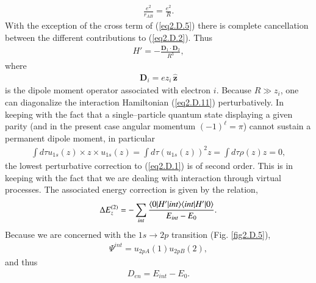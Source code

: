 \begin{subappendices}
\begin{align}
\frac{e^2}{r_{AB}}=\frac{e^2}{R}.
\end{align}
With the exception of the cross term of (\ref{eq2.D.5}) there is complete cancellation between the different contributions to (\ref{eq2.D.2}). Thus
\begin{align}\label{eq2.D.11}
H'=-\frac{\mathbf D_1\cdot\mathbf D_2}{R^3},
\end{align} 
where
\begin{align}\label{eq2.D.12}
\mathbf D_i=ez_i\,\hat {\mathbf{z}}
\end{align} 
is the dipole moment operator associated with electron $i$. Because $R\gg z_i$, one can diagonalize the interaction Hamiltonian (\ref{eq2.D.11}) perturbatively. In keeping with the fact that   a single--particle quantum state displaying a given parity (and in the present case angular momentum $(-1)^\ell=\pi$) cannot sustain a permanent dipole moment, in particular
\begin{align}\label{eq2.D.13}
\int d\tau u_{1s}(z)\times z\times u_{1s}(z)=\int d\tau (u_{1s}(z))^2z=\int d\tau \rho(z)z=0,
\end{align} 
 the lowest perturbative correction to (\ref{eq2.D.1}) is of second order. This is in keeping with the fact that we are dealing with interaction through virtual processes. The associated energy correction is given by the relation,
 \begin{align}\label{eq2.D.14}
\Delta E_z^{(2)}=-\sum_{int}\frac{\langle {0|H'|int} \rangle\langle {int|H'|0} \rangle}{E_{int}-E_0}.
 \end{align} 
 Because we are concerned with the $1s\to 2p$ transition (Fig. \ref{fig2.D.5}),
  \begin{align}\label{eq2.D.15}
\Psi^{int}=u_{2pA}(1)u_{2pB}(2),
  \end{align} 
 and thus
  \begin{align}\label{eq2.D.16}
D_{en}=E_{int}-E_0.
   \end{align} 
   

\end{subappendices}
